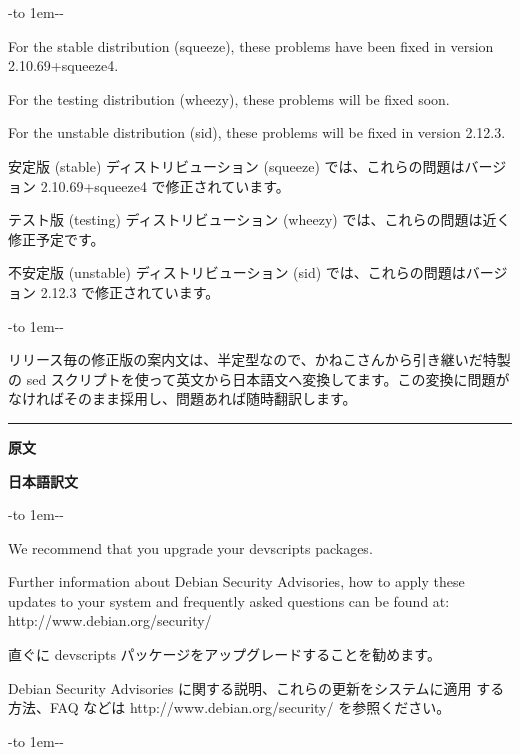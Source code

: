 \documentclass[mingoth,a4paper]{jsarticle}
\begin{document}
-\leaders\hbox to 1em{\hss{}-\hss}\hfill -\par
\parbox[t]{0.47\linewidth}{
For the stable distribution (squeeze), these problems have been fixed in version 2.10.69+squeeze4.

For the testing distribution (wheezy), these problems will be fixed soon.

For the unstable distribution (sid), these problems will be fixed in version 2.12.3.
}\hfil
\parbox[t]{0.48\linewidth}{
安定版 (stable) ディストリビューション (squeeze) では、これらの問題はバージョン 2.10.69+squeeze4 で修正されています。

テスト版 (testing) ディストリビューション (wheezy) では、これらの問題は近く修正予定です。

不安定版 (unstable) ディストリビューション (sid) では、これらの問題はバージョン 2.12.3 で修正されています。
}\hfil

-\leaders\hbox to 1em{\hss{}-\hss}\hfill -\par

\vspace{1ex}\par

リリース毎の修正版の案内文は、半定型なので、かねこさんから引き継いだ特製の sed スクリプトを使って英文から日本語文へ変換してます。この変換に問題がなければそのまま採用し、問題あれば随時翻訳します。

\vspace{1ex}
\pagebreak[2]

\hrule
{}\par
\parbox[t]{0.47\linewidth}{{\bf 原文}}\hfil \parbox{0.48\linewidth}{\bf 日本語訳文}\par\vspace{0.1em}

-\leaders\hbox to 1em{\hss{}-\hss}\hfill -\par
\parbox[t]{0.47\linewidth}{
We recommend that you upgrade your devscripts packages.

Further information about Debian Security Advisories, how to apply
these updates to your system and frequently asked questions can be
found at: http://www.debian.org/security/
}\hfil \vrule \hfil
\parbox[t]{0.48\linewidth}{
直ぐに devscripts パッケージをアップグレードすることを勧めます。

Debian Security Advisories に関する説明、これらの更新をシステムに適用
する方法、FAQ などは http://www.debian.org/security/ を参照ください。
}\hfil

-\leaders\hbox to 1em{\hss{}-\hss}\hfill -\par
\end{document}
